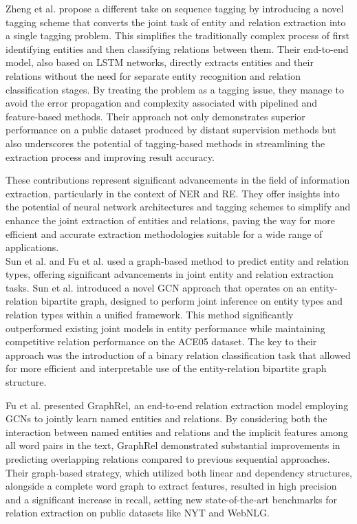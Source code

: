 Zheng et al. propose a different take on sequence tagging by introducing a novel tagging scheme that converts the joint task of entity and relation extraction into a single tagging problem. This simplifies the traditionally complex process of first identifying entities and then classifying relations between them. Their end-to-end model, also based on LSTM networks, directly extracts entities and their relations without the need for separate entity recognition and relation classification stages. By treating the problem as a tagging issue, they manage to avoid the error propagation and complexity associated with pipelined and feature-based methods. Their approach not only demonstrates superior performance on a public dataset produced by distant supervision methods but also underscores the potential of tagging-based methods in streamlining the extraction process and improving result accuracy.

These contributions represent significant advancements in the field of information extraction, particularly in the context of NER and RE. They offer insights into the potential of neural network architectures and tagging schemes to simplify and enhance the joint extraction of entities and relations, paving the way for more efficient and accurate extraction methodologies suitable for a wide range of applications.\\
Sun et al.\cite{sun-etal-2019-joint} and Fu et al.\cite{fu-etal-2019-graphrel} used a graph-based method to predict entity and relation types, offering significant advancements in joint entity and relation extraction tasks. Sun et al. introduced a novel \ac{GCN} approach that operates on an entity-relation bipartite graph, designed to perform joint inference on entity types and relation types within a unified framework. This method significantly outperformed existing joint models in entity performance while maintaining competitive relation performance on the ACE05 dataset. The key to their approach was the introduction of a binary relation classification task that allowed for more efficient and interpretable use of the entity-relation bipartite graph structure. 

Fu et al. presented GraphRel, an end-to-end relation extraction model employing GCNs to jointly learn named entities and relations. By considering both the interaction between named entities and relations and the implicit features among all word pairs in the text, GraphRel demonstrated substantial improvements in predicting overlapping relations compared to previous sequential approaches. Their graph-based strategy, which utilized both linear and dependency structures, alongside a complete word graph to extract features, resulted in high precision and a significant increase in recall, setting new state-of-the-art benchmarks for relation extraction on public datasets like NYT and WebNLG.


